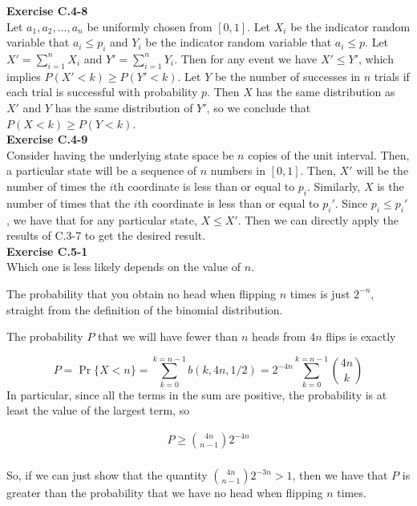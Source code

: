 \documentclass{article}
\begin{document}
\noindent\textbf{Exercise C.4-8}\\

Let $a_1, a_2, \ldots, a_n$ be uniformly chosen from $[0,1]$. Let $X_i$ be the indicator random variable that $a_i \leq p_i$ and $Y_i$ be the indicator random variable that $a_i \leq p$.  Let $X' = \sum_{i=1}^n X_i$ and $Y'=\sum_{i=1}^nY_i$.  Then for any event we have $X' \leq Y'$, which implies $P(X' < k) \geq P(Y'<k)$.  Let $Y$ be the number of successes in $n$ trials if each trial is successful with probability $p$.  Then $X$ has the same distribution as $X'$ and $Y$ has the same distribution of $Y'$, so we conclude that $P(X<k) \geq P(Y<k)$. \\

\noindent\textbf{Exercise C.4-9}\\

Consider having the underlying state space be $n$ copies of the unit interval. Then, a particular state will be a sequence of $n$ numbers in $[0,1]$. Then, $X'$ will be the number of times the $i$th coordinate is less than or equal to $p_i$. Similarly, $X$ is the number of times that the $i$th coordinate is less than or equal to $p_i'$. Since $p_i \le p_i'$, we have that for any particular state, $X\le X'$. Then we can directly apply the results of C.3-7 to get the desired result.\\


\noindent\textbf{Exercise C.5-1}\\

Which one is less likely depends on the value of $n$.

The probability that you obtain no head when flipping $n$ times is just $2^{-n}$, straight from the definition of the binomial distribution. 

The probability $P$ that we will have fewer than $n$ heads from $4n$ flips is exactly
 
\[
P = \Pr\{X < n\} = \sum_{k=0}^{k=n-1} b(k,4n,1/2) = 2^{-4n}\sum_{k=0}^{k=n-1} \binom{4n}{k}
\]
In particular, since all the terms in the sum are positive, the probability is at least the value of the largest term, so

\begin{align*}
P \ge \binom{4n}{n-1} 2^{-4n}\\
\end{align*}

So, if we can just show that the quantity $\binom{4n}{n-1} 2^{-3n} >1$, then we have that $P$ is greater than the probability that we have no head when flipping $n$ times.
\end{document}
